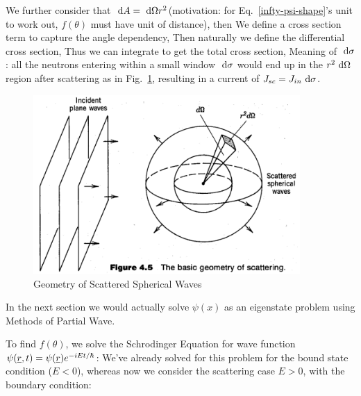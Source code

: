 \documentclass{school-22.101-notes}
\begin{document}
We further consider that $\mbox{ }\mathrm{d} A = \mbox{ }\mathrm{d} \Omega r^2$(motivation: for Eq.~\ref{infty-psi-shape}'s unit to work out, $f(\theta)$ must have unit of distance), then 
We define a cross section term to capture the angle dependency, 
Then naturally we define the differential cross section, 
Thus we can integrate to get the total cross section, 
Meaning of $\mbox{ }\mathrm{d} \sigma$: all the neutrons entering within a small window $\mbox{ }\mathrm{d} \sigma$ would end up in the $r^2 \mbox{ }\mathrm{d} \Omega$ region after scattering as in Fig.~\ref{scattering-geometry}, resulting in a current of $J_{sc} = J_{in} \mbox{ }\mathrm{d} \sigma$. 

\begin{figure}[ht]
\centering
\includegraphics[width=4in]{images/scattering/scattering-geometry.png}
\caption{Geometry of Scattered Spherical Waves} \label{scattering-geometry} 
\end{figure}






In the next section we would actually solve $\psi(x)$ as an eigenstate problem using Methods of Partial Wave. 






To find $f(\theta)$, we solve the Schrodinger Equation for wave function $\psi(\underline{r}, t) = \psi(\underline{r}) e^{-iEt/\hbar}$:
We've already solved for this problem for the bound state condition ($E <0$), whereas now we consider the scattering case $E>0$, with the boundary condition:
\end{document}
